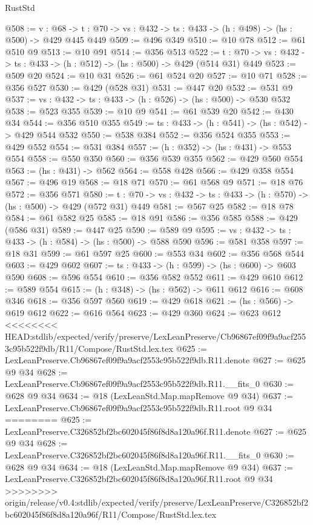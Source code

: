\begin{lexlean}{RustStd}
\begin{coremodule}
{\begin{coremodule}
@508 := {v : @68} ->
  {t : @70} -> {vs : @432} -> {ts : @433} -> (h : @498) -> (hs : @500) -> @429 @445 @449
@509 := @496 @349
@510 := @10 @78
@512 := @61 @510 @9
@513 := @10 @91
@514 := @356 @513
@522 := {t : @70} -> {vs : @432} -> {ts : @433} -> (h : @512) -> (hs : @500) -> @429 (@514 @31) @449
@523 := @509 @20
@524 := @10 @31
@526 := @61 @524 @20
@527 := @10 @71
@528 := @356 @527
@530 := @429 (@528 @31)
@531 := @447 @20
@532 := @531 @9
@537 := {vs : @432} -> {ts : @433} -> (h : @526) -> (hs : @500) -> @530 @532
@538 := @523 @355
@539 := @10 @9
@541 := @61 @539 @20
@542 := @430 @34
@544 := @356 @510 @355
@549 := {ts : @433} -> (h : @541) -> (hs : @542) -> @429 @544 @532
@550 := @538 @384
@552 := @356 @524 @355
@553 := @429 @552
@554 := @531 @384
@557 := (h : @352) -> (hs : @431) -> @553 @554
@558 := @550 @350
@560 := @356 @539 @355
@562 := @429 @560 @554
@563 := (hs : @431) -> @562
@564 := @558 @428
@566 := @429 @358 @554
@567 := @496 @19
@568 := @18 @71
@570 := @61 @568 @9
@571 := @18 @76
@572 := @356 @571
@580 := {t : @70} -> {vs : @432} -> {ts : @433} -> (h : @570) -> (hs : @500) -> @429 (@572 @31) @449
@581 := @567 @25
@582 := @18 @78
@584 := @61 @582 @25
@585 := @18 @91
@586 := @356 @585
@588 := @429 (@586 @31)
@589 := @447 @25
@590 := @589 @9
@595 := {vs : @432} -> {ts : @433} -> (h : @584) -> (hs : @500) -> @588 @590
@596 := @581 @358
@597 := @18 @31
@599 := @61 @597 @25
@600 := @553 @34
@602 := @356 @568 @544
@603 := @429 @602
@607 := {ts : @433} -> (h : @599) -> (hs : @600) -> @603 @590
@608 := @596 @554
@610 := @356 @582 @552
@611 := @429 @610
@612 := @589 @554
@615 := (h : @348) -> (hs : @562) -> @611 @612
@616 := @608 @346
@618 := @356 @597 @560
@619 := @429 @618
@621 := (hs : @566) -> @619 @612
@622 := @616 @564
@623 := @429 @360
@624 := @623 @612
<<<<<<<< HEAD:stdlib/expected/verify/preserve/LexLeanPreserve/Cb96867ef09f9a9acf2553c95b522f9db/R11/Compose/RustStd.lex.tex
@625 := LexLeanPreserve.Cb96867ef09f9a9acf2553c95b522f9db.R11.denote
@627 := @625 @9 @34
@628 := LexLeanPreserve.Cb96867ef09f9a9acf2553c95b522f9db.R11.__fits_0
@630 := @628 @9 @34
@634 := @18 (LexLeanStd.Map.mapRemove @9 @34)
@637 := LexLeanPreserve.Cb96867ef09f9a9acf2553c95b522f9db.R11.root @9 @34
========
@625 := LexLeanPreserve.C326852bf2bc602045f86f8d8a120a96f.R11.denote
@627 := @625 @9 @34
@628 := LexLeanPreserve.C326852bf2bc602045f86f8d8a120a96f.R11.__fits_0
@630 := @628 @9 @34
@634 := @18 (LexLeanStd.Map.mapRemove @9 @34)
@637 := LexLeanPreserve.C326852bf2bc602045f86f8d8a120a96f.R11.root @9 @34
>>>>>>>> origin/release/v0.4:stdlib/expected/verify/preserve/LexLeanPreserve/C326852bf2bc602045f86f8d8a120a96f/R11/Compose/RustStd.lex.tex

\end{coremodule}}
\end{coremodule}
\end{lexlean}
